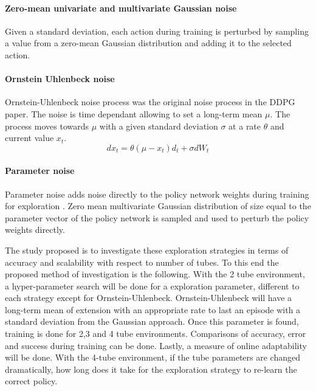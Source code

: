 \paragraph{Zero-mean univariate and multivariate Gaussian noise}
Given a standard deviation, each action during training is perturbed by sampling a value from a zero-mean Gaussian distribution and adding it to the selected action.

\paragraph{Ornstein Uhlenbeck noise}
Ornstein-Uhlenbeck noise process was the original noise process in the DDPG paper. The noise is time dependant allowing to set a long-term mean $\mu$. The process moves towards $\mu$ with a given standard deviation $\sigma$ at a rate $\theta$ and current value $x_t$.
\begin{equation}
dx_t = \theta \left( \mu - x_t \right) d_t + \sigma d W_t
\end{equation}

\paragraph{Parameter noise}
Parameter noise adds noise directly to the policy network weights during training for exploration \cite{plappert2017parameter}. Zero mean multivariate Gaussian distribution of size equal to the parameter vector of the policy network is sampled and used to perturb the policy weights directly.

The study proposed is to investigate these exploration strategies in terms of accuracy and scalability with respect to number of tubes. To this end the proposed method of investigation is the following. With the 2 tube environment, a hyper-parameter search will be done for a exploration parameter, different to each strategy except for Ornstein-Uhlenbeck. Ornstein-Uhlenbeck will have a long-term mean of extension with an appropriate rate to last an episode with a standard deviation from the Gaussian approach. Once this parameter is found, training is done for 2,3 and 4 tube environments. Comparisons of accuracy, error and success during training can be done. Lastly, a measure of online adaptability will be done. With the 4-tube environment, if the tube parameters are changed dramatically, how long does it take for the exploration strategy to re-learn the correct policy.


